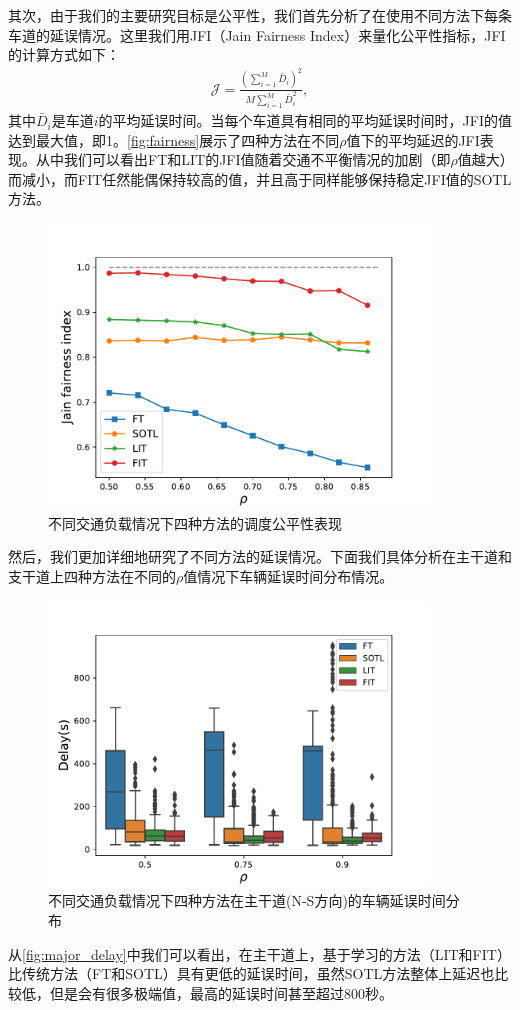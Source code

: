其次，由于我们的主要研究目标是公平性，我们首先分析了在使用不同方法下每条车道的延误情况。这里我们用JFI（Jain Fairness Index）来量化公平性指标，JFI的计算方式如下：
\begin{align}
    \mathcal{J}=\frac{\left(\sum_{i=1}^{M} \bar{D}_{i}\right)^{2}}{M \sum_{i=1}^{M} \bar{D}_{i}^{2}},
\end{align}
其中$\bar{D}_{i}$是车道$i$的平均延误时间。当每个车道具有相同的平均延误时间时，JFI的值达到最大值，即1。\autoref{fig:fairness}展示了四种方法在不同$\rho$值下的平均延迟的JFI表现。从中我们可以看出FT和LIT的JFI值随着交通不平衡情况的加剧（即$\rho$值越大）而减小，而FIT任然能偶保持较高的值，并且高于同样能够保持稳定JFI值的SOTL方法。
\begin{figure}[htb]
    \includegraphics[width=0.9\textwidth]{fig/fairness.pdf}
    \caption{不同交通负载情况下四种方法的调度公平性表现}
    \label{fig:fairness}
\end{figure}

然后，我们更加详细地研究了不同方法的延误情况。下面我们具体分析在主干道和支干道上四种方法在不同的$\rho$值情况下车辆延误时间分布情况。
\begin{figure}[htb]
    \includegraphics[width=0.9\textwidth]{fig/major_delay.pdf}
    \caption{不同交通负载情况下四种方法在主干道(N-S方向)的车辆延误时间分布}
    \label{fig:major_delay}
\end{figure}
从\autoref{fig:major_delay}中我们可以看出，在主干道上，基于学习的方法（LIT和FIT）比传统方法（FT和SOTL）具有更低的延误时间，虽然SOTL方法整体上延迟也比较低，但是会有很多极端值，最高的延误时间甚至超过800秒。

